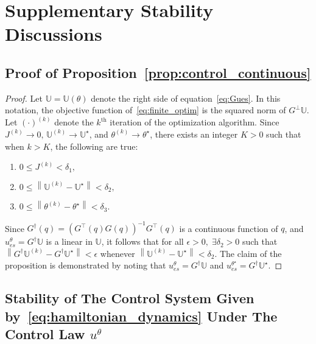 \appendix

\newcommand*{\bbU}{\mathbb{U}}

\section{Supplementary Stability Discussions}

\subsection{Proof of Proposition~\ref{prop:control_continuous}}
\label{appendix:proof_control_continuous}

\begin{proof}
    Let $\bbU = \bbU(\theta)$ denote the right side of
    equation~\eqref{eq:Gues}. 
    In this notation, the objective function of~\eqref{eq:finite_optim}
    is the squared norm of $G^{\perp} \bbU$. 
    Let $(\cdot)^{(k)}$ denote the $k^{\textrm{th}}$ iteration of the
    optimization algorithm.
    Since 
    $J^{(k)} \to 0,\, \bbU^{(k)} \to \bbU^{\star}$, 
    and
    $\theta^{(k)} \to \theta^{\star}$, 
    there exists an integer $K>0$ such that when $k > K$, the following are true:
    \begin{enumerate}%
        \item $0 \leq J^{(k)} < \delta_1,$
        \item $0 \leq \left\| \bbU^{(k)} - \bbU^{\star }\right\| < \delta_2,$
        \item $0 \leq \left\| \theta^{(k)} - \theta^{\star }\right\|  < \delta_3$.
    \end{enumerate}
    Since $G^{\dagger} (q) = \left( G^{\top}(q) G(q) \right)^{-1} G^{\top}(q)$ is a
    continuous function of $q$, and $ u_{es}^\theta = G^{\dagger} \bbU $ is a linear in
    $\bbU$, it follows that for all $\epsilon > 0,\; \exists \delta_2 > 0$ such that
    $ \left\| G^{\dagger} \bbU^{(k)} - G^{\dagger} \bbU^{\star} \right\| < \epsilon $ 
    whenever 
    $ \left\| \bbU^{(k)} - \bbU^{\star} \right\| < \delta_2 $.
    The claim of the proposition is demonstrated by noting that $u_{es}^\theta =
    G^{\dagger} \bbU$ and $u_{es}^{\theta^\star} = G^{\dagger} \bbU^{\star}$. 
\end{proof}


\subsection{Stability of The Control System Given by~\eqref{eq:hamiltonian_dynamics} Under The Control Law $u^\theta$}
\label{appendix:stability_continuity}

